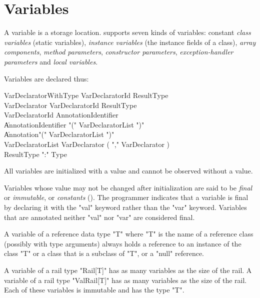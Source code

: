 \chapter{Variables}\label{XtenVariables}

A variable is a storage location.  \Xten{} supports seven kinds of
variables: constant {\em class variables} (static variables), {\em
  instance variables} (the instance fields of a class), {\em array
  components}, {\em method parameters}, {\em constructor parameters},
{\em exception-handler parameters} and {\em local variables}.

Variables are declared thus:

\begin{grammar}
VarDeclaratorWithType \: VarDeclaratorId ResultType \\
VarDeclarator \: VarDeclaratorId ResultType\opt \\
VarDeclaratorId \: Annotation\star Identifier \\
              \| Annotation\star Identifier \xcd"(" VarDeclaratorList \xcd")" \\
              \| Annotation\star \xcd"(" VarDeclaratorList \xcd")" \\
VarDeclaratorList \: VarDeclarator ( \xcd"," VarDeclarator )\star \\
ResultType \: \xcd":" Type \\
\end{grammar}

\label{exploded-syntax}
\label{VariableDeclarations}

All variables are initialized with a value and cannot be observed without
a value. 

Variables whose value may not be changed after initialization
are said to be {\em final} or {\em immutable}, or {\em constants} ().
The programmer indicates that a variable is final by declaring
it with the \xcd"val" keyword rather than the \xcd"var" keyword.
Variables that are annotated neither \xcd"val" nor \xcd"var"
are considered final.

A variable of a reference data type \xcd"T" where \xcd"T" is the name
of a reference class (possibly with type arguments) always holds a
reference to an instance of the class \xcd"T" or a class that is a
subclass of \xcd"T", or a \xcd"null" reference.



A variable of a rail type \xcd"Rail[T]" has
as many variables as the size of the rail.
A variable of a rail type \xcd"ValRail[T]" has
as many variables as the size of the rail.
Each of these variables is immutable and has the type \xcd"T".

